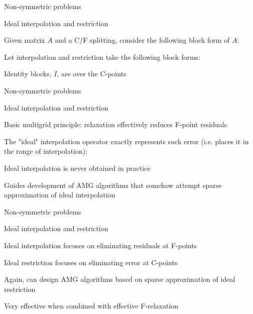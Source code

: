 \documentclass[18pt,xcolor=table]{beamer}
\begin{document}
\begin{frame}{Non-symmetric problems}
\begin{block}{Ideal interpolation and restriction}
\bit
\item Given matrix $A$ and a C/F splitting, consider the following block form of $A$:
\item Let interpolation and restriction take the following block forms:
\item Identity blocks, $I$, are over the C-points
\eit
\end{block}
\end{frame}

\begin{frame}{Non-symmetric problems}
\begin{block}{Ideal interpolation and restriction}
\bit
\item Basic multigrid principle: relaxation effectively reduces F-point residuals
\item The "ideal" interpolation operator exactly represents such error (i.e. places it in the range of interpolation):
\item Ideal interpolation is never obtained in practice
\item Guides development of AMG algorithms that somehow attempt sparse approximation of ideal interpolation
\eit
\end{block}
\end{frame}

\begin{frame}{Non-symmetric problems}
\begin{block}{Ideal interpolation and restriction}
\bit
\item Ideal interpolation focuses on eliminating residuals at F-points
\item Ideal restriction focuses on eliminating error at C-points
\item Again, can design AMG algorithms based on sparse approximation of ideal restriction
\item Very effective when combined with effective F-relaxation
\eit
\end{block}
\end{frame}
\end{document}
